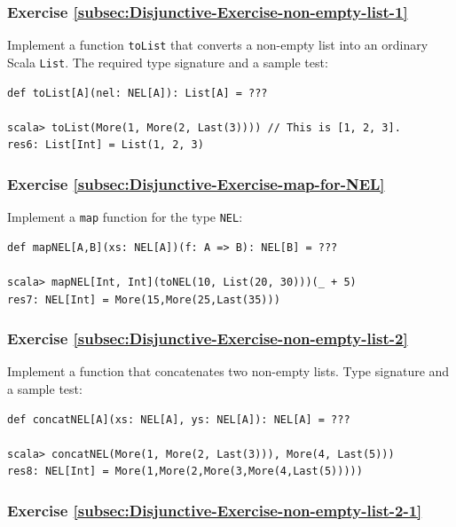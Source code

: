 \subsubsection{Exercise \label{subsec:Disjunctive-Exercise-non-empty-list-1}\ref{subsec:Disjunctive-Exercise-non-empty-list-1}}

Implement a function \lstinline!toList! that converts a non-empty
list into an ordinary Scala \lstinline!List!. The required type signature
and a sample test:
\begin{lstlisting}
def toList[A](nel: NEL[A]): List[A] = ???

scala> toList(More(1, More(2, Last(3)))) // This is [1, 2, 3].
res6: List[Int] = List(1, 2, 3)
\end{lstlisting}


\subsubsection{Exercise \label{subsec:Disjunctive-Exercise-map-for-NEL}\ref{subsec:Disjunctive-Exercise-map-for-NEL}}

Implement a \lstinline!map! function for the type \lstinline!NEL!:
\begin{lstlisting}
def mapNEL[A,B](xs: NEL[A])(f: A => B): NEL[B] = ???

scala> mapNEL[Int, Int](toNEL(10, List(20, 30)))(_ + 5)
res7: NEL[Int] = More(15,More(25,Last(35)))
\end{lstlisting}


\subsubsection{Exercise \label{subsec:Disjunctive-Exercise-non-empty-list-2}\ref{subsec:Disjunctive-Exercise-non-empty-list-2}}

Implement a function that concatenates two non-empty lists. Type signature
and a sample test:
\begin{lstlisting}
def concatNEL[A](xs: NEL[A], ys: NEL[A]): NEL[A] = ???

scala> concatNEL(More(1, More(2, Last(3))), More(4, Last(5)))
res8: NEL[Int] = More(1,More(2,More(3,More(4,Last(5)))))
\end{lstlisting}


\subsubsection{Exercise \label{subsec:Disjunctive-Exercise-non-empty-list-2-1}\ref{subsec:Disjunctive-Exercise-non-empty-list-2-1}}

